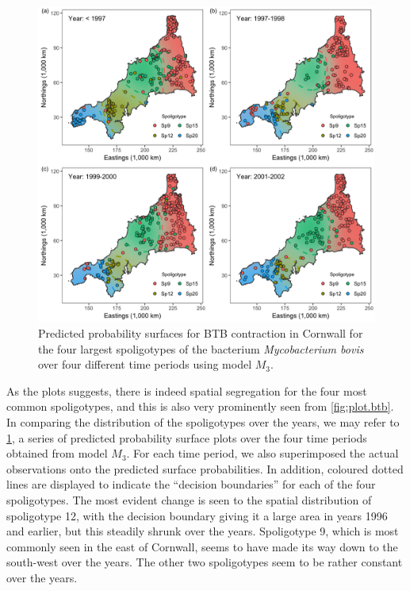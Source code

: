 \documentclass[a4paper,showframe,11pt]{report}\usepackage[]{graphicx}\usepackage[]{color}
\newenvironment{knitrout}{}{} %
\begin{document}
\begin{knitrout}
\color{fgcolor}\begin{figure}[p]

{\centering \includegraphics[width=\linewidth]{figure/05-plot_temporal_btb-1} 

}

\caption[Predicted probability surfaces for BTB contraction in Cornwall for the four largest spoligotypes of the bacterium \emph{Mycobacterium bovis} over four different time periods using model $M_3$]{Predicted probability surfaces for BTB contraction in Cornwall for the four largest spoligotypes of the bacterium \emph{Mycobacterium bovis} over four different time periods using model $M_3$.}\label{fig:plot.temporal.btb}
\end{figure}


\end{knitrout}

As the plots suggests, there is indeed spatial segregation for the four most common spoligotypes, and this is also very prominently seen from \cref{fig:plot.btb}.
In comparing the distribution of the spoligotypes over the years, we may refer to \cref{fig:plot.temporal.btb}, a series of predicted probability surface plots over the four time periods obtained from model $M_3$.
For each time period, we also superimposed the actual observations onto the predicted surface probabilities.
In addition, coloured dotted lines are displayed to indicate the ``decision boundaries'' for each of the four spoligotypes.
The most evident change is seen to the spatial distribution of spoligotype 12, with the decision boundary giving it a large area in years 1996 and earlier, but this steadily shrunk over the years.
Spoligotype 9, which is most commonly seen in the east of Cornwall, seems to have made its way down to the south-west over the years.
The other two spoligotypes seem to be rather constant over the years.
\end{document}
